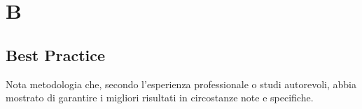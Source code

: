 \section*{B}

\subsection{Best Practice}
Nota metodologia che, secondo l'esperienza professionale o studi autorevoli, abbia mostrato di garantire i migliori risultati in circostanze note e specifiche.